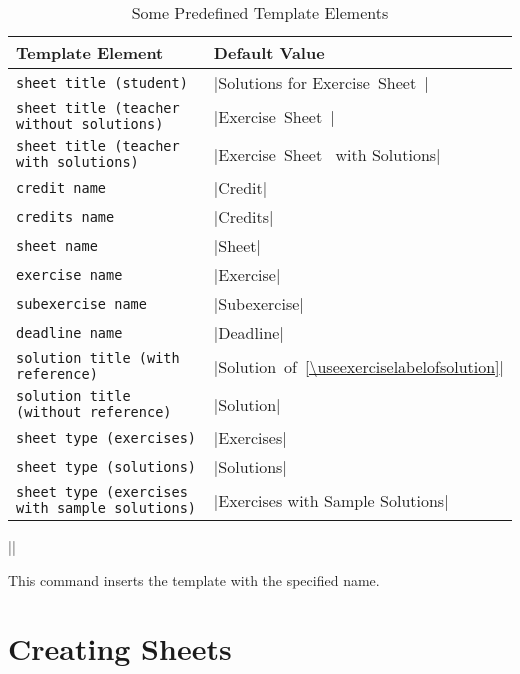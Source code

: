 \documentclass[a4paper,fleqn]{report}
\def\sheettemplatekey#1{\lstinline[language={}]{#1}}
\def\syntaxdefaultarg#1{\hfill\texttt{\small #1}\par\smallskip\noindent\ignorespaces}
\def\metaargument#1{\textit{\small #1}}
\begin{document}
\begin{table}[htbp]
  \caption{Some Predefined Template Elements}
  \label{table:template elements}
  \centering
  \bigskip
  \begin{tabular}{lp{}}
    Template Element & Default Value \\ \midrule
    \sheettemplatekey{sheet title (student)} & 
      |Solutions for Exercise~Sheet~\thesheet{}| \\
    \sheettemplatekey{sheet title (teacher without solutions)} & 
      |Exercise~Sheet~\thesheet{}| \\
    \sheettemplatekey{sheet title (teacher with solutions)} & 
      |Exercise~Sheet~\thesheet{} with Solutions| \\
    \sheettemplatekey{credit name} & 
      |Credit| \\
    \sheettemplatekey{credits name} & 
      |Credits| \\
    \sheettemplatekey{sheet name} & 
      |Sheet| \\
    \sheettemplatekey{exercise name} & 
      |Exercise| \\
    \sheettemplatekey{subexercise name} & 
      |Subexercise| \\
    \sheettemplatekey{deadline name} & 
      |Deadline| \\
    \sheettemplatekey{solution title (with reference)} &
      |Solution~of~\ref{\useexerciselabelofsolution}| \\
    \sheettemplatekey{solution title (without reference)} & 
      |Solution| \\
    \sheettemplatekey{sheet type (exercises)} &
      |Exercises| \\
    \sheettemplatekey{sheet type (solutions)} &
      |Solutions| \\
    \sheettemplatekey{sheet type (exercises with sample solutions)} &
      |Exercises with Sample Solutions| \\
  \end{tabular}
\end{table}

\begin{syntax}
  |\usesheettemplate{|\metaargument{template name}|}|
  \syntaxdefaultarg{}
  This command inserts the template with the specified name.
\end{syntax}

\section{Creating Sheets}
\end{document}
